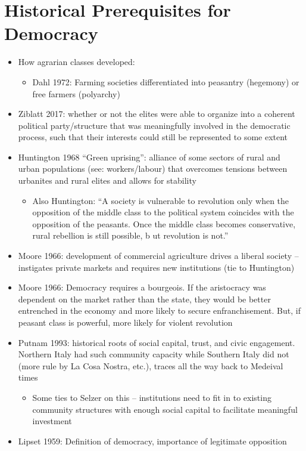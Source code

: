 \documentclass[12pt]{article}
\begin{document}
\section*{Historical Prerequisites for Democracy}

\begin{itemize}
    \item How agrarian classes developed:
    \begin{itemize}
        \item Dahl 1972: Farming societies differentiated into peasantry (hegemony) or free farmers (polyarchy)
    \end{itemize}
    \item Ziblatt 2017: whether or not the elites were able to organize into a coherent political party/structure that was meaningfully involved in the democratic process, such that their interests could still be represented to some extent
    \item Huntington 1968 ``Green uprising'': alliance of some sectors of rural and urban populations (see: workers/labour) that overcomes tensions between urbanites and rural elites and allows for stability
    \begin{itemize}
        \item Also Huntington: ``A society is vulnerable to revolution only when the opposition of the middle class to the political system coincides with the opposition of the peasants. Once the middle class becomes conservative, rural rebellion is still possible, b ut revolution is not.''
    \end{itemize}
    \item Moore 1966: development of commercial agriculture drives a liberal society -- instigates private markets and requires new institutions (tie to Huntington)
    \item Moore 1966: Democracy requires a bourgeois. If the aristocracy was dependent on the market rather than the state, they would be better entrenched in the economy and more likely to secure enfranchisement. But, if peasant class is powerful, more likely for violent revolution
    \item Putnam 1993: historical roots of social capital, trust, and civic engagement. Northern Italy had such community capacity while Southern Italy did not (more rule by La Cosa Nostra, etc.), traces all the way back to Medeival times
    \begin{itemize}
        \item Some ties to Selzer on this -- institutions need to fit in to existing community structures with enough social capital to facilitate meaningful investment
    \end{itemize}
    \item Lipset 1959: Definition of democracy, importance of legitimate opposition
\end{itemize}
\end{document}
